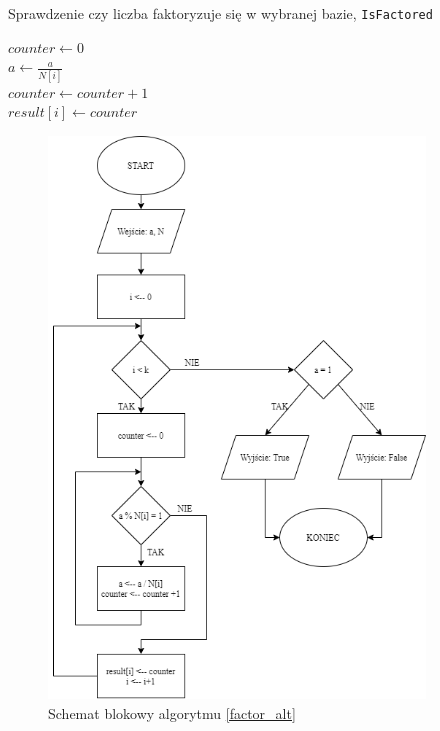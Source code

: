 \documentclass[]{article}
\begin{document}
		\begin{algorithm}[H]
			\SetAlgoLined
			\caption{Sprawdzenie czy liczba faktoryzuje się w wybranej bazie, \texttt{IsFactored}}
			\label{factor_alt}
			{
				\(counter \gets 0\) \\
				{
					\(a \gets \frac{a}{N[i]}\) \\
					\(counter \gets counter + 1\) \\
				}
				\(result[i] \gets counter\) \\
			}
			{
			}
			\Else
			{
			}
			
		\end{algorithm}
	
		\begin{figure}[H]
			\begin{center}
				\includegraphics[width=10cm]{alg 5.png} \caption{Schemat blokowy algorytmu \ref{factor_alt}}
			\end{center}
		\end{figure}
	
\end{document}
